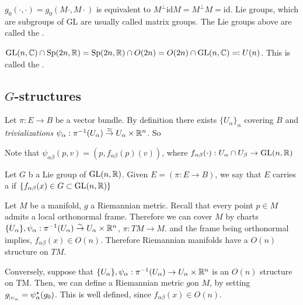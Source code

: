 \begin{remark}
    \(g_0(\cdot,\cdot)=g_0(M\cdot,M\cdot)\) is equivalent to \(M^\perp \text{id} M=M^\perp M=\text{id}\).
    Lie groups, which are subgroups of GL are usually called matrix groups. The Lie groups above are called the .
\end{remark}

 \(\text{GL}(n,\mathbb{C})\cap \text{Sp}(2n,\mathbb{R})=\text{Sp}(2n,\mathbb{R})\cap O(2n)=O(2n)\cap\text{GL}(n,\mathbb{C})\eqqcolon U(n)\).
This is called the .

\subsection{\(G\)-structures}

 Let \(\pi:E\to B\) be a vector bundle. By definition there exists \(\{U_\alpha\}_\alpha\)
covering \(B\) and \textit{trivializations} \(\psi_\alpha: \pi^{-1}(U_\alpha)\stackrel{\simeq}{\to}U_\alpha\times \mathbb{R}^n\).
So 
Note that \(\psi_{\alpha\beta}(p,v)=(p,f_{\alpha\beta}(p)(v))\), where \(f_{\alpha\beta}(\cdot):U_\alpha\cap U_\beta\to \text{GL}(n,\mathbb{R})\)
\begin{definition*}
    Let \(G\) b a Lie group of \(\text{GL}(n,\mathbb{R})\). Given \(E=(\pi:E\to B)\), we say that 
    \(E\) carries a  if \(\{f_{\alpha\beta}(x)\in G\subset \text{GL}(n,\mathbb{R})\}\)
\end{definition*}

\begin{example}
    Let \(M\) be a manifold, \(g\) a Riemannian metric. Recall that every point \(p\in M\) admits a local 
    orthonormal frame. Therefore we can cover \(M\) by charts \(\{U_\alpha\},\psi_\alpha:\pi^{-1}(U_\alpha)\stackrel{\sim}{\to}U_\alpha\times \mathbb{R}^n\), \(\pi:TM\to M\).
    and the frame being orthonormal implies, \(f_{\alpha\beta}(x)\in O(n)\). Therefore 
    Riemannian manifolds have a \(O(n)\) structure on \(TM\).
\end{example}

Conversely, suppose that \(\{U_\alpha\},\psi_\alpha:\pi^{-1}(U_\alpha)\to U_\alpha\times \mathbb{R}^n\) is an \(O(n)\) structure on TM. Then, we can 
define a Riemannian metric \(g\)on \(M\), by setting \(g_{|_{U_\alpha}}=\psi_\alpha^{\star}(g_0)\). This 
is well defined, since \(f_{\alpha\beta}(x)\in O(n)\).

